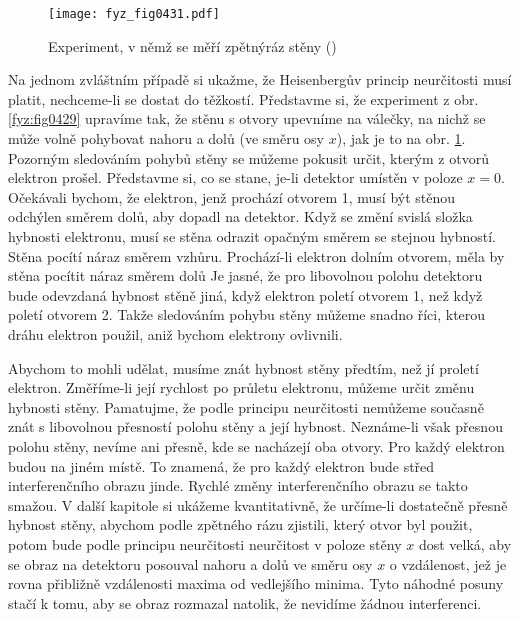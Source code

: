     \begin{figure}[ht!] %
      \centering
      \texttt{[image: fyz\_fig0431.pdf]}
      \caption{Experiment, v němž se měří zpětnýráz stěny (\cite[s.~697]{Feynman01})}
      \label{fyz:fig0431}
    \end{figure}

    Na jednom zvláštním případě si ukažme, že Heisenbergův princip neurčitosti musí platit,
    nechceme-li se dostat do těžkostí. Představme si, že experiment z obr. \ref{fyz:fig0429} upravíme
    tak, že stěnu s otvory upevníme na válečky, na nichž se může volně pohybovat nahoru a dolů (ve
    směru osy \(x\)), jak je to na obr. \ref{fyz:fig0431}. Pozorným sledováním pohybů stěny se můžeme
    pokusit určit, kterým z otvorů elektron prošel. Představme si, co se stane, je-li detektor
    umístěn v poloze \(x= 0\). Očekávali bychom, že elektron, jenž prochází otvorem 1, musí být
    stěnou odchýlen směrem dolů, aby dopadl na detektor. Když se změní svislá složka hybnosti
    elektronu, musí se stěna odrazit opačným směrem se stejnou hybností. Stěna pocítí náraz směrem
    vzhůru. Prochází-li elektron dolním otvorem, měla by stěna pocítit náraz směrem dolů Je jasné,
    že pro libovolnou polohu detektoru bude odevzdaná hybnost stěně jiná, když elektron poletí
    otvorem 1, než když poletí otvorem 2. Takže sledováním pohybu stěny můžeme snadno říci, kterou
    dráhu elektron použil, aniž bychom elektrony ovlivnili.

    Abychom to mohli udělat, musíme znát hybnost stěny předtím, než jí proletí elektron. Změříme-li
    její rychlost po průletu elektronu, můžeme určit změnu hybnosti stěny. Pamatujme, že podle
    principu neurčitosti nemůžeme současně znát s libovolnou přesností polohu stěny a její hybnost.
    Neznáme-li však přesnou polohu stěny, nevíme ani přesně, kde se nacházejí oba otvory. Pro každý
    elektron budou na jiném místě. To znamená, že pro každý elektron bude střed interferenčního
    obrazu jinde. Rychlé změny interferenčního obrazu se takto smažou. V další kapitole si ukážeme
    kvantitativně, že určíme-li dostatečně přesně hybnost stěny, abychom podle zpětného rázu
    zjistili, který otvor byl použit, potom bude podle principu neurčitosti neurčitost v poloze
    stěny \(x\) dost velká, aby se obraz na detektoru posouval nahoru a dolů ve směru osy \(x\) o
    vzdálenost, jež je rovna přibližně vzdálenosti maxima od vedlejšího minima. Tyto náhodné posuny
    stačí k tomu, aby se obraz rozmazal natolik, že nevidíme žádnou interferenci.
    
